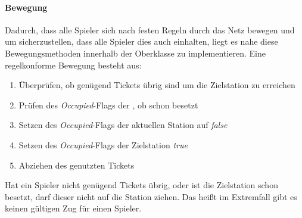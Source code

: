                 \paragraph{Bewegung}
                    Dadurch, dass alle Spieler sich nach festen Regeln durch das Netz bewegen und um sicherzustellen,
                    dass alle Spieler dies auch einhalten, liegt es nahe diese Bewegungsmethoden innerhalb der Oberklasse zu implementieren.
                    \newline
                    Eine regelkonforme Bewegung besteht aus:
                        \begin{enumerate}
                            \item Überprüfen, ob genügend Tickets übrig sind um die Zielstation zu erreichen
                            \item Prüfen des \textit{Occupied}-Flags der , ob schon besetzt
                            \item Setzen des \textit{Occupied}-Flags der aktuellen Station auf \textit{false}
                            \item Setzen des \textit{Occupied}-Flags der Zielstation \textit{true}
                            \item Abziehen des genutzten Tickets
                        \end{enumerate}
                    Hat ein Spieler nicht genügend Tickets übrig, oder ist die Zielstation schon besetzt, darf dieser nicht auf die Station ziehen. 
                    Das heißt im Extremfall gibt es keinen gültigen Zug für einen Spieler.

